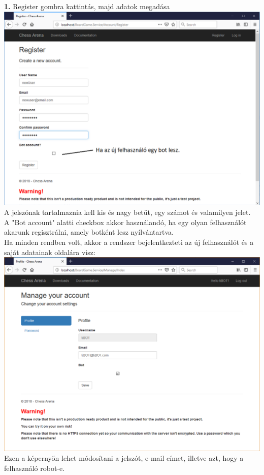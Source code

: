 \documentclass[twoside, a4paper, 12pt]{book}
\begin{document}
\noindent \textbf{1.} Register gombra kattintás, majd adatok megadása \\
\includegraphics[width=1.0\textwidth]{img/service_register.png} \\
A jelszónak tartalmaznia kell kis és nagy betűt, egy számot és valamilyen jelet.\\
A "Bot account" alatti checkbox akkor használandó, ha egy olyan felhasználót akarunk regisztrálni, amely botként lesz nyílvántartva. \\
Ha minden rendben volt, akkor a rendszer bejelentkezteti az új felhasználót és a saját adatainak oldalára visz: \\
\includegraphics[width=1.0\textwidth]{img/service_account.png} \\
Ezen a képernyőn lehet módosítani a jelszót, e-mail címet, illetve azt, hogy a felhasználó robot-e.
\end{document}
